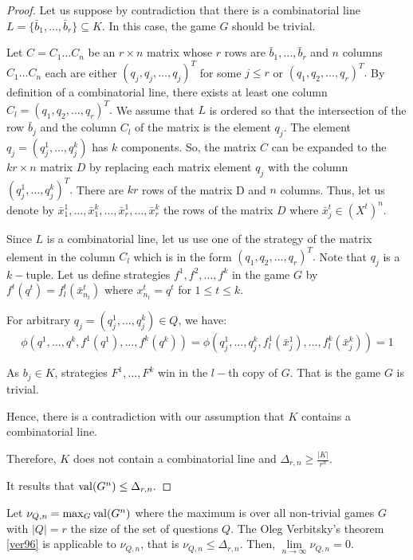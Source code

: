 \begin{proof}
Let us suppose by contradiction that there is a combinatorial line $L=\{\bar{b}_1, \ldots, \bar{b}_r \} \subseteq K.$ In this case,  the game  $G$ should be trivial.
 
Let $C=C_1\ldots C_n$ be an $r \times n$ matrix whose $r$ rows are $\bar{b}_1, \ldots, \bar{b}_r$ and $n$ columns $C_1\ldots C_n$ each are either $(q_j,q_j,\ldots,q_j)^T$ for some $j\leq r$ or $(q_1,q_2,\ldots,q_r)^T.$ By definition of a combinatorial line, there exists at least one column $C_l=(q_1,q_2,\ldots,q_r)^T.$ We assume that $L$ is ordered so that the intersection of the row $\bar{b}_j$ and the column $C_l$ of the matrix is the element $q_j.$ The element $q_j=(q_j^1,\ldots, q_j^k)$ has $k$ components. So, the  matrix $C$ can be expanded to the $kr \times n$ matrix $D$ by replacing each matrix element $q_j$ with the column $(q_j^1,\ldots, q_j^k)^T.$ There are $kr$ rows of the matrix D and $n$ columns. Thus, let us denote by $\bar{x}_1^1, \ldots, \bar{x}_1^k, \ldots, \bar{x}_r^1, \ldots, \bar{x}_r^k$ the rows of the matrix $D$ where $\bar{x}_j^t \in  (X^t)^n.$

Since $L$ is a combinatorial line, let us use one of the strategy of the matrix element in the column $C_l$ which is in the form $(q_1,q_2,\ldots,q_r)^T.$  Note that $q_j$ is a $k-$tuple. 
Let us define strategies $f^1,f^2, \ldots, f^k$ in the game $G$ by $f^t(q^t)=f_l^t(\bar{x}_{n_t}^t)$ where $x_{n_t}^t=q^t$ for $1\leq t \leq k.$ 

For  arbitrary $q_j= (q_j^1,\ldots, q_j^k) \in Q$, we have:
$$\phi (q^1,\ldots, q^k, f^1(q^1), \ldots, f^k(q^k))= \phi (q_j^1,\ldots, q_j^k, f_l^1(\bar{x}_j^1), \ldots, f_l^k(\bar{x}_j^k))=1$$

As $b_j \in K$, strategies $F^1, \ldots, F^k$ win in  the $l-$th copy of $G$. That is the game $G$ is  trivial. 

Hence, there is a contradiction with our assumption that $K$ contains a combinatorial line.

Therefore, $K$ does not contain a combinatorial line and $\Delta_{r,n} \geq  \frac{|K|}{r^n}$.

It results that $\mathrm{val} (G^n) \leq \Delta_{r,n}.$
\end{proof}

Let $\nu_{Q,n}=\max_G \mathrm{val} (G^n)$ where the maximum is over all non-trivial games $G$ with $|Q|=r$ the size of the set of questions $Q.$ 
The Oleg Verbitsky's theorem \eqref{ver96} is applicable to $\nu_{Q,n}$, that is $\nu_{Q,n} \leq \Delta_{r,n}.$
Then, $\lim\limits_{n\longrightarrow \infty} \nu_{Q,n}=0.$

